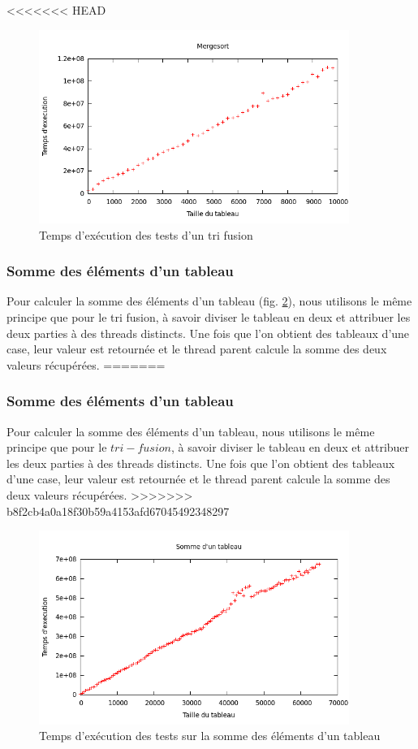 <<<<<<< HEAD
\begin{figure}[H]
\centering
\includegraphics[width=0.9\textwidth]{mergesort.png}
\caption{Temps d'exécution des tests d'un tri fusion}
\label{fig:mergesort}
\end{figure}

\subsubsection{Somme des éléments d'un tableau} Pour calculer la somme des
éléments d'un tableau (fig. \ref{fig:arraysum}), nous utilisons le même principe que pour le tri fusion,
à savoir diviser le tableau en deux et attribuer les deux parties à des threads
distincts. Une fois que l'on obtient des tableaux d'une case, leur valeur est
retournée et le thread parent calcule la somme des deux valeurs récupérées.
=======

\subsubsection{Somme des éléments d'un tableau}
Pour calculer la somme des éléments d'un tableau, nous utilisons le même principe que pour le $tri-fusion$, à savoir diviser le tableau en deux et attribuer les deux parties à des threads distincts. Une fois que l'on obtient des tableaux d'une case, leur valeur est retournée et le thread parent calcule la somme des deux valeurs récupérées.
>>>>>>> b8f2cb4a0a18f30b59a4153afd67045492348297

\begin{figure}[H]
\centering
\includegraphics[width=0.9\textwidth]{arraysum.png}
\caption{Temps d'exécution des tests sur la somme des éléments d'un tableau}
\label{fig:arraysum}
\end{figure}
